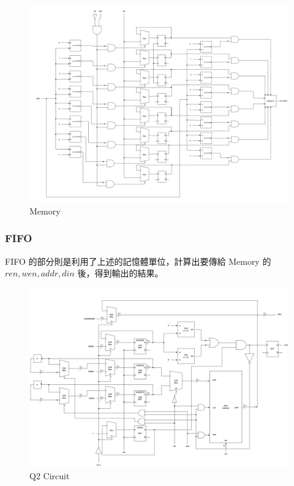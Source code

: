 \documentclass[10.5pt,compsoc,UTF8]{CjC}
\theoremstyle{mystyle}
\begin{document}
\begin{figure}[!h]
  \centering
  \includegraphics[width=\textwidth]{./img/Memory.png}
  \caption{Memory}
  \label{fig:Memory}
\end{figure}
\newpage

\subsubsection*{FIFO}
FIFO 的部分則是利用了上述的記憶體單位，計算出要傳給 Memory 的 $ren, wen, addr, din$ 後，得到輸出的結果。

\begin{figure}[!h]
  \centering
  \includegraphics[width=\textwidth]{./img/Q2.png}
  \caption{Q2 Circuit}
  \label{fig:Q2-Circuit}
\end{figure}
\end{document}
